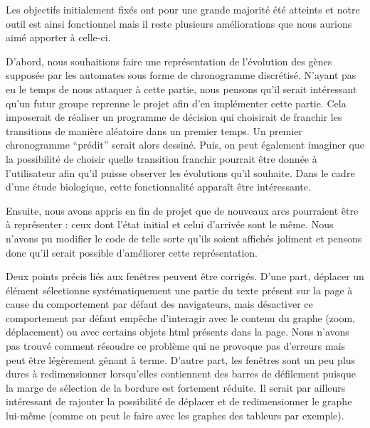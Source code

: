 Les objectifs initialement fixés ont pour une grande majorité été atteints et notre outil est ainsi fonctionnel mais il reste plusieurs améliorations que nous aurions aimé apporter à celle-ci. 

D’abord, nous souhaitions faire une représentation de l'évolution des gènes supposée par les automates sous forme de chronogramme discrétisé. N’ayant pas eu le temps de nous attaquer à cette partie, nous pensons qu’il serait intéressant qu’un futur groupe reprenne le projet afin d’en implémenter cette partie. Cela imposerait de réaliser un programme de décision qui choisirait de franchir les transitions de manière aléatoire dans un premier temps. Un premier chronogramme “prédit” serait alors dessiné. Puis, on peut également imaginer que la possibilité de choisir quelle transition franchir pourrait être donnée à l’utilisateur afin qu’il puisse observer les évolutions qu’il souhaite. Dans le cadre d’une étude biologique, cette fonctionnalité apparaît être intéressante. 

Ensuite, nous avons appris en fin de projet que de nouveaux arcs pourraient être à représenter : ceux dont l’état initial et celui d’arrivée sont le même. Nous n’avons pu modifier le code de telle sorte qu’ils soient affichés joliment et pensons donc qu’il serait possible d’améliorer cette représentation. 

Deux points précis liés aux fenêtres peuvent être corrigés. D’une part, déplacer un élément sélectionne systématiquement une partie du texte présent sur la page à cause du comportement par défaut des navigateurs, mais désactiver ce comportement par défaut empêche d’interagir avec le contenu du graphe (zoom, déplacement) ou avec certains objets html présents dans la page. Nous n’avons pas trouvé comment résoudre ce problème qui ne provoque pas d’erreurs mais peut être légèrement gênant à terme. D’autre part, les fenêtres sont un peu plus dures à redimensionner lorsqu’elles contiennent des barres de défilement puisque la marge de sélection de la bordure est fortement réduite.
Il serait par ailleurs intéressant de rajouter la possibilité de déplacer et de redimensionner le graphe lui-même (comme on peut le faire avec les graphes des tableurs par exemple).
